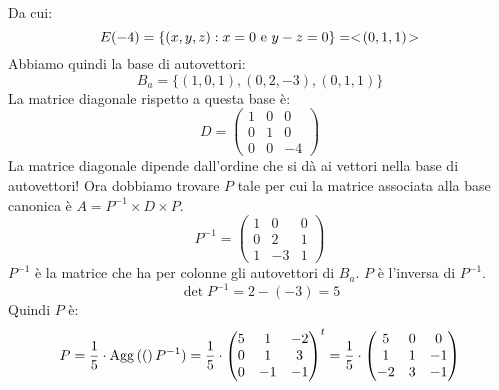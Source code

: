 \begin{exmp}
\[\]
Da cui:
\[
E(-4) = \{ (x,y,z) : x = 0 \text{ e } y - z = 0 \} = <\!{(0,1,1)}\!>
\]
Abbiamo quindi la base di autovettori:
\[
B_a = \{ (1,0,1), (0,2,-3), (0,1,1) \}
\]
La matrice diagonale rispetto a questa base \`e:
\[
D =
\begin{pmatrix}
1 & 0 & 0 \\
0 & 1 & 0 \\
0 & 0 & -4
\end{pmatrix}
\]
La matrice diagonale dipende dall'ordine che si d\`a ai vettori nella base di autovettori! Ora dobbiamo trovare $P$ tale per cui la matrice associata alla base canonica \`e $A = P^{-1} \times D \times P$.
\[
P^{-1} =
\begin{pmatrix}
1 & 0 & 0 \\ 
0 & 2 & 1 \\
1 & -3 & 1
\end{pmatrix}
\]
$P^{-1}$ \`e la matrice che ha per colonne gli autovettori di $B_a$. $P$ \`e l'inversa di $P^{-1}$.
\[
\det{P^{-1}} = 2 - (-3) = 5
\]
Quindi $P$ \`e:
\[
P = \frac{1}{5} \cdot \operatorname{Agg} \left( {(} \right)P^{-1}) = 
\frac{1}{5} \cdot 
{\begin{pmatrix}
5 & 1 & -2 \\
0 & 1 & 3 \\
0 & -1 & -1
\end{pmatrix}}^t =
\frac{1}{5} \cdot 
\begin{pmatrix}
5 & 0 & 0 \\
1 & 1 & -1 \\
-2 & 3 & -1
\end{pmatrix}
\]
\end{exmp}

